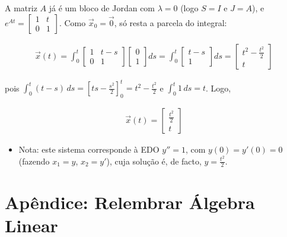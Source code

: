 \documentclass{article}
\begin{document}
A matriz $A$ já é um bloco de Jordan com $\lambda = 0$ (logo $S = I$ e $J = A$), e
$e^{At} = \begin{bmatrix} 1 & t \\ 0 & 1 \end{bmatrix}$. Como $\vec{x}_0 = \vec{0}$, só resta a parcela do
integral:

\begin{gather*}
\vec{x}(t) = \int_{0}^{t}
\begin{bmatrix}
1 & t - s \\
0 & 1
\end{bmatrix}
\begin{bmatrix}
0 \\
1
\end{bmatrix}
ds
= \int_{0}^{t}
\begin{bmatrix}
t - s \\
1
\end{bmatrix}
ds
=
\begin{bmatrix}
t^2 - \frac{t^2}{2} \\
t
\end{bmatrix}
\end{gather*}

pois $\int_{0}^{t} (t - s) \, ds = \left[ ts - \frac{s^2}{2} \right]_0^t = t^2 - \frac{t^2}{2}$ e
$\int_{0}^{t} 1 \, ds = t$. Logo,

\begin{gather*}
\boxed{\vec{x}(t) =
\begin{bmatrix}
\frac{t^2}{2} \\
t
\end{bmatrix}}
\end{gather*}

\begin{itemize}
    \item Nota: este sistema corresponde à EDO $y'' = 1$, com $y(0) = y'(0) = 0$ (fazendo $x_1 = y$,
    $x_2 = y'$), cuja solução é, de facto, $y = \frac{t^2}{2}$.
\end{itemize}

\newpage

\section{Apêndice: Relembrar Álgebra Linear}
\label{sec: algebra-linear}
\end{document}
